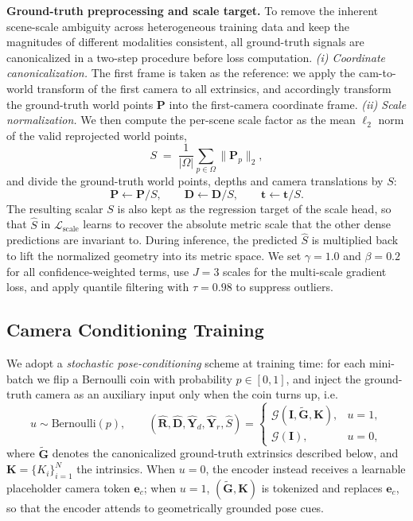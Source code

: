 \documentclass{llmxive}
\begin{document}
\noindent\textbf{Ground-truth preprocessing and scale target.}
To remove the inherent scene-scale ambiguity across heterogeneous training data and keep the magnitudes of different modalities consistent, all ground-truth signals are canonicalized in a two-step procedure before loss computation.
%
\emph{(i) Coordinate canonicalization.} The first frame is taken as the reference: we apply the \mbox{cam-to-world} transform of the first camera to all extrinsics, and accordingly transform the ground-truth world points $\mathbf{P}$ into the first-camera coordinate frame.
%
\emph{(ii) Scale normalization.} We then compute the per-scene scale factor as the mean $\ell_2$ norm of the valid reprojected world points,
\begin{equation}
S \;=\; \frac{1}{|\Omega|}\sum_{p\in\Omega} \|\mathbf{P}_p\|_2,
\label{eq:gt_scale}
\end{equation}
and divide the ground-truth world points, depths and camera translations by $S$:
\begin{equation}
\mathbf{P}\!\leftarrow\!\mathbf{P}/S,\qquad
\mathbf{D}\!\leftarrow\!\mathbf{D}/S,\qquad
\mathbf{t}\!\leftarrow\!\mathbf{t}/S.
\end{equation}
%
The resulting scalar $S$ is also kept as the regression target of the scale head, so that $\hat{S}$ in $\mathcal{L}_{\text{scale}}$ learns to recover the absolute metric scale that the other dense predictions are invariant to. During inference, the predicted $\hat{S}$ is multiplied back to lift the normalized geometry into its metric space.
%
We set $\gamma=1.0$ and $\beta=0.2$ for all confidence-weighted terms, use $J=3$ scales for the multi-scale gradient loss, and apply quantile filtering with $\tau=0.98$ to suppress outliers.

\subsection{Camera Conditioning Training}
\label{sec:pose_cond}
We adopt a \emph{stochastic pose-conditioning} scheme at training time: for each mini-batch we flip a Bernoulli coin with probability $p\in[0,1]$, and inject the ground-truth camera as an auxiliary input only when the coin turns up, i.e.\
\begin{equation}
u \sim \mathrm{Bernoulli}(p),\qquad
(\hat{\mathbf{R}},\hat{\mathbf{D}},\hat{\mathbf{Y}}_d,\hat{\mathbf{Y}}_r,\hat{S}) =
\begin{cases}
\mathcal{G}(\mathbf{I},\tilde{\mathbf{G}},\mathbf{K}), & u=1,\\[2pt]
\mathcal{G}(\mathbf{I}), & u=0,
\end{cases}
\end{equation}
where $\tilde{\mathbf{G}}$ denotes the canonicalized ground-truth extrinsics described below, and $\mathbf{K}=\{K_i\}_{i=1}^{N}$ the intrinsics. When $u=0$, the encoder instead receives a learnable placeholder camera token $\mathbf{e}_c$; when $u=1$, $(\tilde{\mathbf{G}},\mathbf{K})$ is tokenized and replaces $\mathbf{e}_c$, so that the encoder attends to geometrically grounded pose cues.
\end{document}
